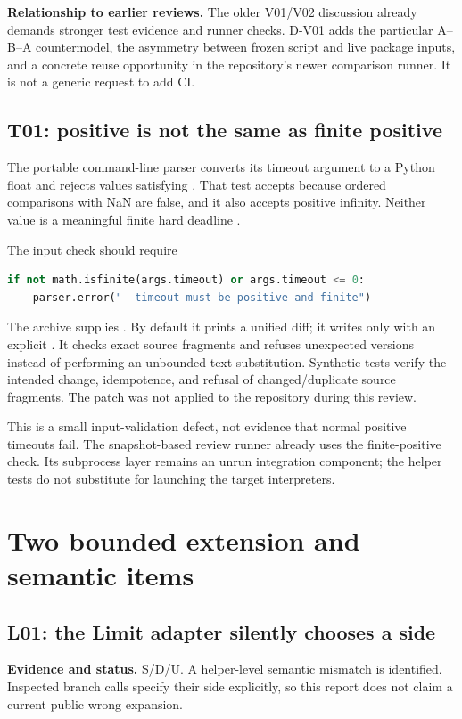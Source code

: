 \documentclass[11pt,a4paper]{article}
\newcommand{\code}[1]{\texttt{\detokenize{#1}}}
\newcommand{\evidence}[1]{\par\noindent\textbf{Evidence and status.} #1\par}
\newcommand{\novelty}[1]{\par\noindent\textbf{Relationship to earlier reviews.} #1\par}
\theoremstyle{remark}
\begin{document}
\novelty{The older V01/V02 discussion already demands stronger test evidence and runner checks. D-V01 adds the particular A--B--A countermodel, the asymmetry between frozen script and live package inputs, and a concrete reuse opportunity in the repository's newer comparison runner. It is not a generic request to add CI.}

\subsection{T01: positive is not the same as finite positive}

The portable command-line parser converts its timeout argument to a Python float and rejects values satisfying \code{timeout <= 0}. That test accepts \code{nan} because ordered comparisons with NaN are false, and it also accepts positive infinity. Neither value is a meaningful finite hard deadline \cite{runner}.

The input check should require
\begin{lstlisting}[language=Python]
if not math.isfinite(args.timeout) or args.timeout <= 0:
    parser.error("--timeout must be positive and finite")
\end{lstlisting}
The archive supplies . By default it prints a unified diff; it writes only with an explicit \code{--apply}. It checks exact source fragments and refuses unexpected versions instead of performing an unbounded text substitution. Synthetic tests verify the intended change, idempotence, and refusal of changed/duplicate source fragments. The patch was not applied to the repository during this review.

This is a small input-validation defect, not evidence that normal positive timeouts fail. The snapshot-based review runner already uses the finite-positive check. Its subprocess layer remains an unrun integration component; the helper tests do not substitute for launching the target interpreters.

\section{Two bounded extension and semantic items}
\subsection{L01: the Limit adapter silently chooses a side}\label{sec:limit}
\evidence{S/D/U. A helper-level semantic mismatch is identified. Inspected branch calls specify their side explicitly, so this report does not claim a current public wrong expansion.}
\end{document}
